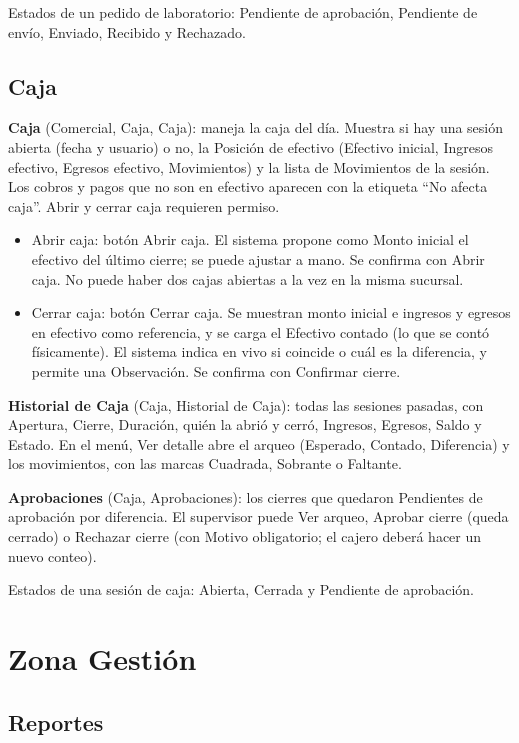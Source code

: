 Estados de un pedido de laboratorio: Pendiente de aprobación, Pendiente de envío, Enviado, Recibido y Rechazado.

\subsection{Caja}
\label{sec:mu-caja}

\textbf{Caja} (Comercial, Caja, Caja): maneja la caja del día. Muestra si hay una sesión abierta (fecha y usuario) o no, la Posición de efectivo (Efectivo inicial, Ingresos efectivo, Egresos efectivo, Movimientos) y la lista de Movimientos de la sesión. Los cobros y pagos que no son en efectivo aparecen con la etiqueta ``No afecta caja''. Abrir y cerrar caja requieren permiso.

\begin{itemize}
  \item Abrir caja: botón Abrir caja. El sistema propone como Monto inicial el efectivo del último cierre; se puede ajustar a mano. Se confirma con Abrir caja. No puede haber dos cajas abiertas a la vez en la misma sucursal.
  \item Cerrar caja: botón Cerrar caja. Se muestran monto inicial e ingresos y egresos en efectivo como referencia, y se carga el Efectivo contado (lo que se contó físicamente). El sistema indica en vivo si coincide o cuál es la diferencia, y permite una Observación. Se confirma con Confirmar cierre.
\end{itemize}

\textbf{Historial de Caja} (Caja, Historial de Caja): todas las sesiones pasadas, con Apertura, Cierre, Duración, quién la abrió y cerró, Ingresos, Egresos, Saldo y Estado. En el menú, Ver detalle abre el arqueo (Esperado, Contado, Diferencia) y los movimientos, con las marcas Cuadrada, Sobrante o Faltante.

\textbf{Aprobaciones} (Caja, Aprobaciones): los cierres que quedaron Pendientes de aprobación por diferencia. El supervisor puede Ver arqueo, Aprobar cierre (queda cerrado) o Rechazar cierre (con Motivo obligatorio; el cajero deberá hacer un nuevo conteo).

Estados de una sesión de caja: Abierta, Cerrada y Pendiente de aprobación.

\section{Zona Gestión}
\label{sec:mu-zona-gestion}

\subsection{Reportes}
\label{sec:mu-reportes}

